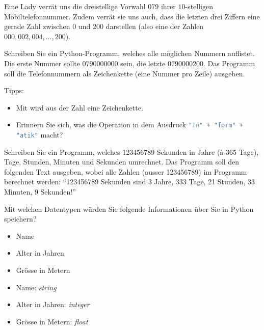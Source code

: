 \begin{mysubmission}\label{ex:str}
	Eine Lady verrät uns die dreistellige Vorwahl $079$ ihrer $10$-stelligen Mobiltelefonnummer. Zudem verrät sie uns auch, dass die letzten drei Ziffern eine gerade Zahl zwischen 0 und 200 darstellen (also eine der Zahlen $000, 002, 004, \ldots, 200$).

	Schreiben Sie ein Python-Programm, welches alle möglichen Nummern auflistet.
	Die erste Nummer sollte $0790000000$ sein, die letzte $0790000200$.
	Das Programm soll die Telefonnummern als Zeichenkette (eine Nummer pro Zeile) ausgeben.

	Tipps:
	\begin{itemize}
		\item Mit 
		      wird aus der Zahl  eine Zeichenkette.
		\item Erinnern Sie sich, was die Operation \pythoninline{+} in dem Ausdruck \lstinline[language=Python,basicstyle=\ttfamily\normalsize]!"In" + "form" + "atik"! macht?
	\end{itemize}
	\begin{myanswer}
		
	\end{myanswer}

\end{mysubmission}

\begin{mychallenge}\label{ex:sToY}
	Schreiben Sie ein Programm, welches 123456789 Sekunden in Jahre (à 365 Tage), Tage, Stunden, Minuten und Sekunden umrechnet.
	Das Programm soll den folgenden Text ausgeben, wobei alle Zahlen (ausser 123456789) im Programm berechnet werden: ``123456789 Sekunden sind 3 Jahre, 333 Tage, 21 Stunden, 33 Minuten, 9 Sekunden!''

	\begin{myanswer}
		
	\end{myanswer}
\end{mychallenge}

\begin{myexercise}\label{ex:datatypes}
	Mit welchen Datentypen würden Sie folgende Informationen über Sie in Python speichern?
	\begin{itemize}
		\item Name
		\item Alter in Jahren
		\item Grösse in Metern
	\end{itemize}
	\begin{myanswer}
		\begin{itemize}
			\item Name: \textit{string}
			\item Alter in Jahren: \textit{integer}
			\item Grösse in Metern: \textit{float}
		\end{itemize}
	\end{myanswer}
\end{myexercise}

